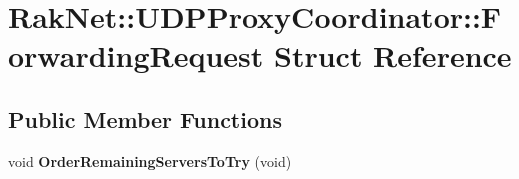 \hypertarget{struct_rak_net_1_1_u_d_p_proxy_coordinator_1_1_forwarding_request}{\section{Rak\-Net\-:\-:U\-D\-P\-Proxy\-Coordinator\-:\-:Forwarding\-Request Struct Reference}
\label{struct_rak_net_1_1_u_d_p_proxy_coordinator_1_1_forwarding_request}
}
\subsection*{Public Member Functions}
\begin{DoxyCompactItemize}
\item 
\hypertarget{struct_rak_net_1_1_u_d_p_proxy_coordinator_1_1_forwarding_request_a2896acfcda940cb2832d12616e043081}{void {\bfseries Order\-Remaining\-Servers\-To\-Try} (void)}\label{struct_rak_net_1_1_u_d_p_proxy_coordinator_1_1_forwarding_request_a2896acfcda940cb2832d12616e043081}

\end{DoxyCompactItemize}
